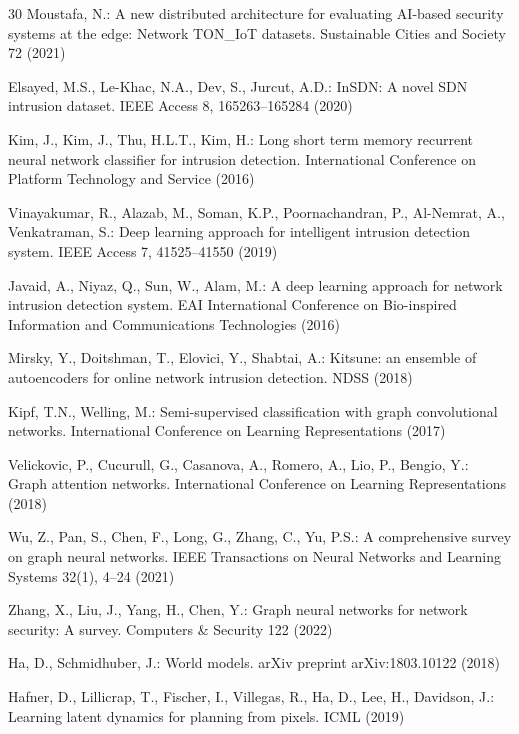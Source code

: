 \documentclass[runningheads]{llncs}
\begin{document}
\begin{thebibliography}{30}
Moustafa, N.: A new distributed architecture for evaluating AI-based security
systems at the edge: Network TON\_IoT datasets. Sustainable Cities and Society
72 (2021)

Elsayed, M.S., Le-Khac, N.A., Dev, S., Jurcut, A.D.: InSDN: A novel SDN
intrusion dataset. IEEE Access 8, 165263--165284 (2020)

Kim, J., Kim, J., Thu, H.L.T., Kim, H.: Long short term memory recurrent
neural network classifier for intrusion detection. International Conference on
Platform Technology and Service (2016)

Vinayakumar, R., Alazab, M., Soman, K.P., Poornachandran, P., Al-Nemrat, A.,
Venkatraman, S.: Deep learning approach for intelligent intrusion detection
system. IEEE Access 7, 41525--41550 (2019)

Javaid, A., Niyaz, Q., Sun, W., Alam, M.: A deep learning approach for network
intrusion detection system. EAI International Conference on Bio-inspired
Information and Communications Technologies (2016)

Mirsky, Y., Doitshman, T., Elovici, Y., Shabtai, A.: Kitsune: an ensemble of
autoencoders for online network intrusion detection. NDSS (2018)

Kipf, T.N., Welling, M.: Semi-supervised classification with graph
convolutional networks. International Conference on Learning Representations
(2017)

Velickovic, P., Cucurull, G., Casanova, A., Romero, A., Lio, P., Bengio, Y.:
Graph attention networks. International Conference on Learning Representations
(2018)

Wu, Z., Pan, S., Chen, F., Long, G., Zhang, C., Yu, P.S.: A comprehensive
survey on graph neural networks. IEEE Transactions on Neural Networks and
Learning Systems 32(1), 4--24 (2021)

Zhang, X., Liu, J., Yang, H., Chen, Y.: Graph neural networks for network
security: A survey. Computers \& Security 122 (2022)

Ha, D., Schmidhuber, J.: World models. arXiv preprint arXiv:1803.10122 (2018)

Hafner, D., Lillicrap, T., Fischer, I., Villegas, R., Ha, D., Lee, H.,
Davidson, J.: Learning latent dynamics for planning from pixels. ICML (2019)


\end{thebibliography}
\end{document}
